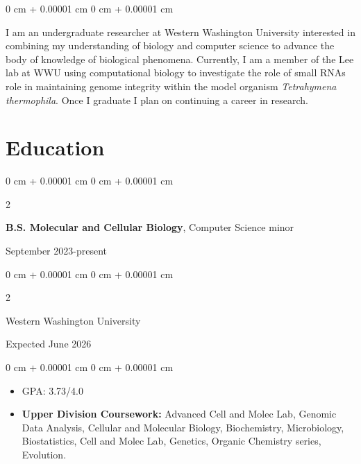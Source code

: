 \documentclass[10pt, article]{article}
\newenvironment{highlights}{
    \begin{itemize}[
        topsep=0.10 cm,
        parsep=0.10 cm,
        partopsep=0pt,
        itemsep=0pt,
        leftmargin=0 cm + 10pt
    ]
}{
    \end{itemize}
} %
\newenvironment{onecolentry}{
    \begin{adjustwidth}{
        0 cm + 0.00001 cm
    }{
        0 cm + 0.00001 cm
    }
}{
    \end{adjustwidth}
} %
\newenvironment{twocolentry}[2][]{
    \onecolentry
    \def\secondColumn{#2}
    \setcolumnwidth{\fill, 4.5 cm}
    \begin{paracol}{2}
}{
    \switchcolumn \raggedleft \secondColumn
    \end{paracol}
    \endonecolentry
} %
\begin{document}
        \begin{onecolentry}
          I am an undergraduate researcher at Western Washington University interested in combining my understanding of biology and computer science to advance the body of knowledge of biological phenomena.
          Currently, I am a member of the Lee lab at WWU
          using computational biology to investigate the role of small RNAs role in maintaining genome integrity within the model organism \textit{Tetrahymena thermophila}. 
           Once I graduate I plan on continuing a career in research. 
        \end{onecolentry}






    \section{Education}




        \begin{twocolentry}{
            September 2023-present}
          \textbf{B.S. Molecular and Cellular Biology}, Computer Science minor 
        \end{twocolentry}
        \begin{twocolentry}{
            Expected June 2026
        }
            Western Washington University 

        \end{twocolentry}

        \vspace{0.10 cm}
        \begin{onecolentry}
            \begin{highlights}
                \item GPA: 3.73/4.0 %
                \item \textbf{Upper Division Coursework:} Advanced Cell and Molec Lab, Genomic Data Analysis, Cellular and Molecular Biology, Biochemistry, Microbiology, Biostatistics, Cell and Molec Lab, Genetics, Organic Chemistry series, Evolution.

            \end{highlights}
        \end{onecolentry}
\end{document}
